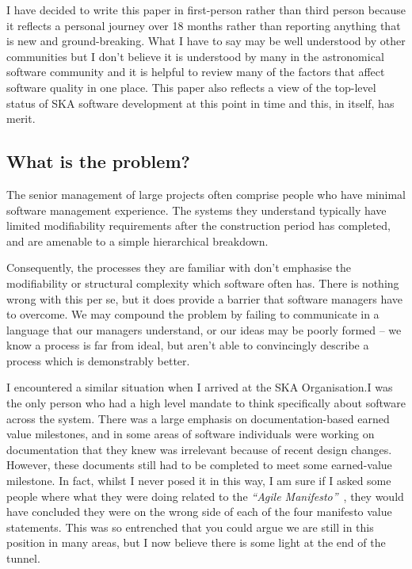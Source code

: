 \documentclass[11pt,twoside]{article}
\begin{document}
I have decided to write this paper in first-person rather than third person because it reflects a personal journey over 18 months rather than reporting anything that is new and ground-breaking. What I have to say may be well understood by other communities but I don't believe it is understood by many in the astronomical software community and it is helpful to review many of the factors that affect software quality in one place. This paper also reflects a view of the top-level status of SKA software development at this point in time and this, in itself, has merit.

\subsection{What is the problem?} %
\label{sub:what_is_the_problem}
The senior management of large projects often comprise people who have minimal software management experience. The systems they understand typically have limited modifiability requirements after the construction period has completed, and are amenable to a simple hierarchical breakdown. 

Consequently, the processes they are familiar with don't emphasise the modifiability or structural complexity which software often has. There is nothing wrong with this per se, but it does provide a barrier that software managers have to overcome. We may compound the problem by failing to communicate in a language that our managers understand, or our ideas may be poorly formed -- we know a process is far from ideal, but aren't able to convincingly describe a process which is demonstrably better.

I encountered a similar situation when I arrived at the SKA Organisation.I was the only person who had a high level mandate to think specifically about software across the system. There was a large emphasis on documentation-based earned value milestones, and in some areas of software individuals were working on documentation that they knew was irrelevant because of recent design changes. However, these documents still had to be completed to meet some earned-value milestone. In fact, whilst I never posed it in this way, I am sure if I asked some people where what they were doing related to the \emph{``Agile Manifesto''}~\citep{agile2001}, they would have concluded they were on the wrong side of each of the four manifesto value statements. This was so entrenched that you could argue we are still in this position in many areas, but I now believe there is some light at the end of the tunnel.
\end{document}
